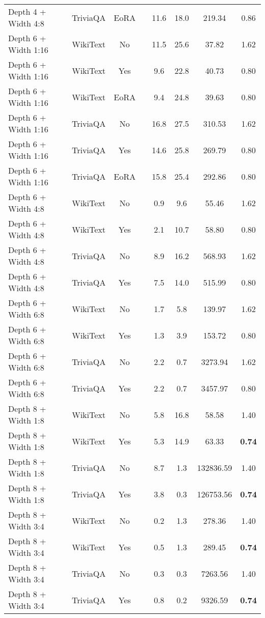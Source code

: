 \begin{longtable}{lcclcccc}
Depth 4 + Width 4:8 & TriviaQA & EoRA & & 11.6 & 18.0 & 219.34 & 0.86 \\
Depth 6 + Width 1:16 & WikiText & No & & 11.5 & 25.6 & 37.82 & 1.62 \\
Depth 6 + Width 1:16 & WikiText & Yes & & 9.6 & 22.8 & 40.73 & 0.80 \\
Depth 6 + Width 1:16 & WikiText & EoRA & & 9.4 & 24.8 & 39.63 & 0.80 \\
Depth 6 + Width 1:16 & TriviaQA & No & & 16.8 & 27.5 & 310.53 & 1.62 \\
Depth 6 + Width 1:16 & TriviaQA & Yes & & 14.6 & 25.8 & 269.79 & 0.80 \\
Depth 6 + Width 1:16 & TriviaQA & EoRA & & 15.8 & 25.4 & 292.86 & 0.80 \\
Depth 6 + Width 4:8 & WikiText & No & & 0.9 & 9.6 & 55.46 & 1.62 \\
Depth 6 + Width 4:8 & WikiText & Yes & & 2.1 & 10.7 & 58.80 & 0.80 \\
Depth 6 + Width 4:8 & TriviaQA & No & & 8.9 & 16.2 & 568.93 & 1.62 \\
Depth 6 + Width 4:8 & TriviaQA & Yes & & 7.5 & 14.0 & 515.99 & 0.80 \\
Depth 6 + Width 6:8 & WikiText & No & & 1.7 & 5.8 & 139.97 & 1.62 \\
Depth 6 + Width 6:8 & WikiText & Yes & & 1.3 & 3.9 & 153.72 & 0.80 \\
Depth 6 + Width 6:8 & TriviaQA & No & & 2.2 & 0.7 & 3273.94 & 1.62 \\
Depth 6 + Width 6:8 & TriviaQA & Yes & & 2.2 & 0.7 & 3457.97 & 0.80 \\
Depth 8 + Width 1:8 & WikiText & No & & 5.8 & 16.8 & 58.58 & 1.40 \\
Depth 8 + Width 1:8 & WikiText & Yes & & 5.3 & 14.9 & 63.33 & \textbf{0.74} \\
Depth 8 + Width 1:8 & TriviaQA & No & & 8.7 & 1.3 & 132836.59 & 1.40 \\
Depth 8 + Width 1:8 & TriviaQA & Yes & & 3.8 & 0.3 & 126753.56 & \textbf{0.74} \\
Depth 8 + Width 3:4 & WikiText & No & & 0.2 & 1.3 & 278.36 & 1.40 \\
Depth 8 + Width 3:4 & WikiText & Yes & & 0.5 & 1.3 & 289.45 & \textbf{0.74} \\
Depth 8 + Width 3:4 & TriviaQA & No & & 0.3 & 0.3 & 7263.56 & 1.40 \\
Depth 8 + Width 3:4 & TriviaQA & Yes & & 0.8 & 0.2 & 9326.59 & \textbf{0.74} \\


\end{longtable}
\normalsize

